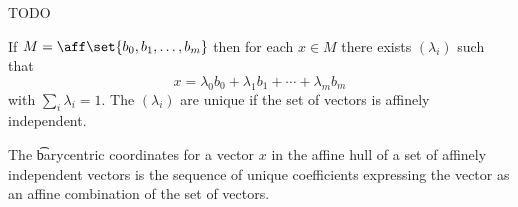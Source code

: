 
\sbasic























\sstart
{}

TODO


\begin{prop}
  If $M = \aff\set{b_0, b_1, \dots, b_m}$ then for each $x \in M$ there exists $(\lambda_i)$ such that
  $$
    x = \lambda_0 b_0 + \lambda_1 b_1 + \cdots + \lambda_m b_m
  $$
  with $\sum_{i} \lambda_i = 1$.
  The $(\lambda_i)$ are unique if the set of vectors is affinely independent.
\end{prop}

The \t{barycentric coordinates} for a vector $x$ in the affine hull of a set of affinely independent vectors is the sequence of unique coefficients expressing the vector as an affine combination of the set of vectors.
\strats
